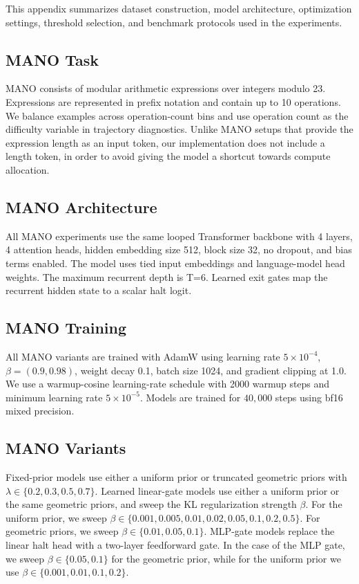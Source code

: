 \documentclass[10pt]{article} %
\begin{document}
This appendix summarizes dataset construction, model architecture, optimization settings, threshold selection, and benchmark protocols used in the experiments.

\subsection{MANO Task}
MANO consists of modular arithmetic expressions over integers modulo 23. Expressions are represented in prefix notation and contain up to 10 operations. We balance examples across operation-count bins and use operation count as the difficulty variable in trajectory diagnostics. Unlike MANO setups that provide the expression length as an input token, our implementation does not include a length token, in order to avoid giving the model a shortcut towards compute allocation.

\subsection{MANO Architecture}
All MANO experiments use the same looped Transformer backbone with 4 layers, 4 attention heads, hidden embedding size 512, block size 32, no dropout, and bias terms enabled. The model uses tied input embeddings and language-model head weights. The maximum recurrent depth is T=6. Learned exit gates map the recurrent hidden state to a scalar halt logit.

\subsection{MANO Training}
All MANO variants are trained with AdamW using learning rate $5\times10^{-4}$, $\beta=(0.9,0.98)$, weight decay 0.1, batch size 1024, and gradient clipping at 1.0. We use a warmup-cosine learning-rate schedule with 2000 warmup steps and minimum learning rate $5\times10^{-5}$. Models are trained for $40{,}000$ steps using bf16 mixed precision.

\subsection{MANO Variants}
Fixed-prior models use either a uniform prior or truncated geometric priors with $\lambda\in\{0.2,0.3,0.5,0.7\}$. Learned linear-gate models use either a uniform prior or the same geometric priors, and sweep the KL regularization strength $\beta$. For the uniform prior, we sweep $\beta\in\{0.001,0.005,0.01,0.02,0.05,0.1,0.2,0.5\}$. For geometric priors, we sweep $\beta\in\{0.01,0.05,0.1\}$. MLP-gate models replace the linear halt head with a two-layer feedforward gate. In the case of the MLP gate, we sweep $\beta\in\{0.05, 0.1\}$ for the geometric prior, while for the uniform prior we use $\beta\in\{0.001, 0.01, 0.1, 0.2\}$.
\end{document}
